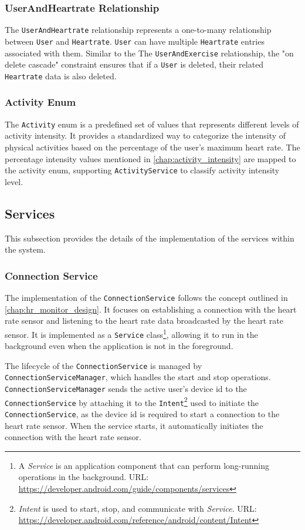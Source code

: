 \subsubsection{UserAndHeartrate Relationship}
The \verb;UserAndHeartrate; relationship represents a one-to-many relationship between \verb;User; and \verb;Heartrate;. 
\verb;User; can have multiple \verb;Heartrate; entries associated with them. Similar to the The \verb;UserAndExercise; relationship, the "on delete cascade" constraint ensures that if a \verb;User; is deleted, their related \verb;Heartrate; data is also deleted.

\subsubsection{Activity Enum}
The \verb;Activity; enum is a predefined set of values that represents different levels of activity intensity. 
It provides a standardized way to categorize the intensity of physical activities based on the percentage of the user's maximum heart rate. 
The percentage intensity values mentioned in \autoref{chap:activity_intensity} are mapped to the activity enum, supporting \verb;ActivityService; to classify activity intensity level.


\subsection{Services}
This subsection provides the details of the implementation of the services within the system.

\subsubsection{Connection Service}
The implementation of the \verb;ConnectionService; follows the concept outlined in \autoref{chap:hr_monitor_design}. It focuses on establishing a connection with the heart rate sensor and listening to the heart rate data broadcasted by the heart rate sensor. 
It is implemented as a \verb;Service; class\footnote{A \emph{Service} is an application component that can perform long-running operations in the background. URL: \url{https://developer.android.com/guide/components/services}}, allowing it to run in the background even when the application is not in the foreground.

The lifecycle of the \verb;ConnectionService; is managed by \verb;ConnectionServiceManager;, which handles the start and stop operations. 
\texttt{ConnectionServiceManager} sends the active user's device id to the \texttt{ConnectionService} by attaching it to the \texttt{Intent}\footnote{\emph{Intent} is used to start, stop, and communicate with \emph{Service}. URL: \url{https://developer.android.com/reference/android/content/Intent}} used to initiate the \texttt{ConnectionService},
as the device id is required to start a connection to the heart rate sensor.
When the service starts, it automatically initiates the connection with the heart rate sensor.

